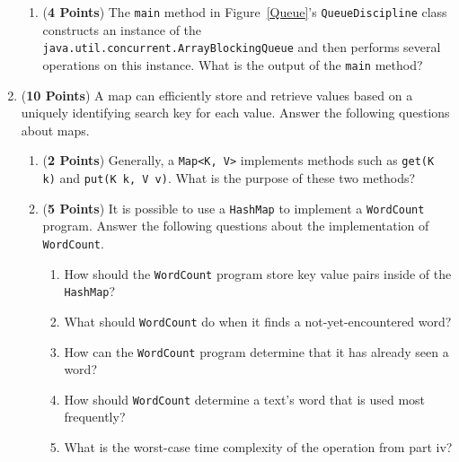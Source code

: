 \documentclass[12pt]{article}
\begin{document}
\begin{enumerate}
\begin{enumerate}
  \item ({\bf 4 Points}) The {\tt main} method in Figure~\ref{Queue}'s {\tt QueueDiscipline} class constructs an
    instance of the {\tt java.util.concurrent.ArrayBlockingQueue} and then performs several operations on this instance.
    What is the output of the {\tt main} method?



  \end{enumerate}

\newpage

\item ({\bf 10 Points}) A map can efficiently store and retrieve values based on a uniquely identifying search key for
each value. Answer the following questions about maps.

\begin{enumerate}

    \item ({\bf 2 Points}) Generally, a {\tt Map<K, V>} implements methods such as {\tt get(K k)} and {\tt put(K k, V
    v)}. What is the purpose of these two methods?

    \item ({\bf 5 Points}) It is possible to use a {\tt HashMap} to implement a {\tt WordCount} program. Answer the
    following questions about the implementation of {\tt WordCount}.

    \begin{enumerate}
      \item How should the {\tt WordCount} program store key value pairs inside of the {\tt HashMap}?
      \item What should {\tt WordCount} do when it finds a not-yet-encountered word?
      \item How can the {\tt WordCount} program determine that it has already seen a word?
      \item How should {\tt WordCount} determine a text's word that is used most frequently?
      \item What is the worst-case time complexity of the operation from part iv?
    \end{enumerate}


\end{enumerate}
\end{enumerate}
\end{document}
